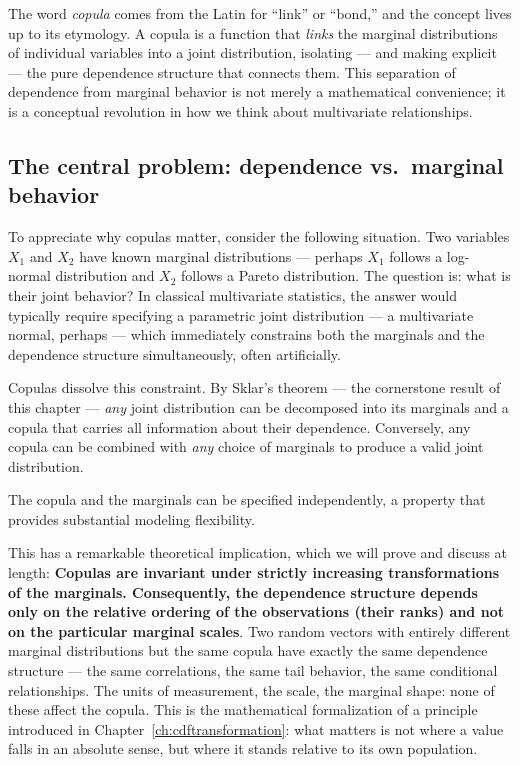 The word \emph{copula} comes from the Latin for ``link'' or ``bond,'' and the concept
lives up to its etymology. A copula is a function that \emph{links} the marginal
distributions of individual variables into a joint distribution, isolating — and making
explicit — the pure dependence structure that connects them. This separation of
dependence from marginal behavior is not merely a mathematical convenience; it is a
conceptual revolution in how we think about multivariate relationships.

\subsection*{The central problem: dependence vs.\ marginal behavior}

To appreciate why copulas matter, consider the following situation. Two variables $X_1$
and $X_2$ have known marginal distributions — perhaps $X_1$ follows a log-normal
distribution and $X_2$ follows a Pareto distribution. The question is: what is their
joint behavior? In classical multivariate statistics, the answer would typically require
specifying a parametric joint distribution — a multivariate normal, perhaps — which
immediately constrains both the marginals and the dependence structure simultaneously,
often artificially.

Copulas dissolve this constraint. By Sklar's theorem — the cornerstone result of this
chapter — \emph{any} joint distribution can be decomposed into its marginals and a
copula that carries all information about their dependence. Conversely, any copula can
be combined with \emph{any} choice of marginals to produce a valid joint distribution.

The copula and the marginals can be specified independently, a property that provides substantial modeling flexibility.

This has a remarkable theoretical implication, which we will prove and discuss at
length: \textbf{Copulas are invariant under strictly increasing transformations of the marginals.
Consequently, the dependence structure depends only on the relative ordering of the
observations (their ranks) and not on the particular marginal scales}. Two random vectors with entirely different marginal
distributions but the same copula have exactly the same dependence structure — the same
correlations, the same tail behavior, the same conditional relationships. The units of
measurement, the scale, the marginal shape: none of these affect the copula. This is
the mathematical formalization of a principle introduced in
Chapter~\ref{ch:cdftransformation}: what matters is not where a value falls in an
absolute sense, but where it stands relative to its own population.

